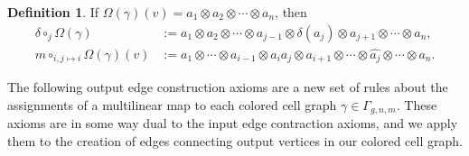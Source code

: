 \documentclass{amsart}
\newcommand{\tensor}{\otimes}
\theoremstyle{definition}
\newtheorem{Def}[Lem]{Definition}
\begin{document}
\begin{Def}
If $\Omega(\gamma)(v)=a_1\tensor a_2\tensor\cdots\tensor a_n$, then
\begin{align*}
	\delta \circ_{j} \Omega(\gamma)&:=a_1\tensor a_2\tensor\cdots\tensor a_{j-1}\tensor \delta(a_j)\tensor a_{j+1}\tensor\cdots\tensor a_n,\\
	m\circ_{i,j\mapsto i}\Omega(\gamma)(v)&:=a_1\tensor\cdots\tensor a_{i-1}\tensor a_ia_j\tensor a_{i+1}\tensor \cdots \tensor \widehat{a_j}\tensor\cdots\tensor a_n.
\end{align*}
\end{Def}
The following output edge construction axioms are a new set of rules about the assignments of a multilinear map to each colored cell graph $\gamma\in\Gamma_{g,n,m}$. These axioms are in some way dual to the input edge contraction axioms, and we apply them to the creation of edges connecting output vertices in our colored cell graph.
\end{document}
